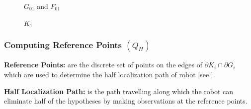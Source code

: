 \documentclass{beamer}
\begin{document}
{\begin{figure}
\begin{center}
\caption{\label{fig:Construction}$G_{01}$ and $F_{01}$}
\end{center}
\end{figure}

\begin{figure}
\begin{center}
\caption{\label{fig:Construction} $K_{1}$}
\end{center}
\end{figure}

}




\frame
{
  \frametitle{Computing Reference Points $(Q_{H})$}

\begin{definition}
 {\bf Reference Points:} are the discrete set of points on the edges of $\partial K_{i} \cap \partial G_{i}$  which are used to determine the
  half localization path of robot [see \cite{key5}].   
\end{definition}

\begin{definition}
 {\bf Half Localization Path:} is the path travelling along which the robot can eliminate half of the hypotheses by making
 observations at the reference points.
\end{definition}
}
\end{document}
